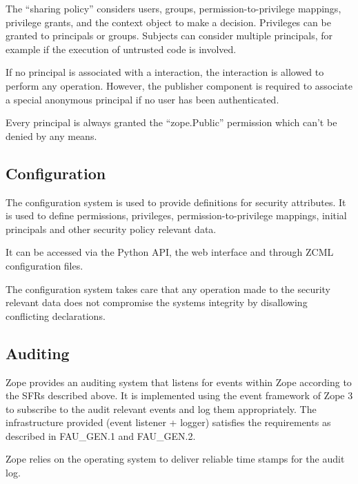 \documentclass[12pt,english]{scrbook}
\begin{document}
The ``sharing policy'' considers users, groups, permission-to-privilege
mappings, privilege grants, and the context object to make a decision.
Privileges can be granted to principals or groups.  Subjects can consider
multiple principals, for example if the execution of untrusted code is
involved.

If no principal is associated with a interaction, the interaction is allowed to
perform any operation. However, the publisher component is required to
associate a special anonymous principal if no user has been authenticated.

Every principal is always granted the ``zope.Public'' permission which can't be
denied by any means.



\subsection{Configuration}

The configuration system is used to provide definitions for security
attributes. It is used to define permissions, privileges,
permission-to-privilege mappings, initial principals and other security policy
relevant data.

It can be accessed via the Python API, the web interface and
through ZCML configuration files.

The configuration system takes care that any operation made to the security
relevant data does not compromise the systems integrity by disallowing
conflicting declarations.

\subsection{Auditing}

Zope provides an auditing system that listens for events within Zope according
to the SFRs described above. It is implemented using the event framework of
Zope 3 to subscribe to the audit relevant events and log them appropriately.
The infrastructure provided (event listener + logger) satisfies the
requirements as described in FAU{\_}GEN.1 and FAU{\_}GEN.2.

Zope relies on the operating system to deliver reliable time stamps for the
audit log.


\end{document}
